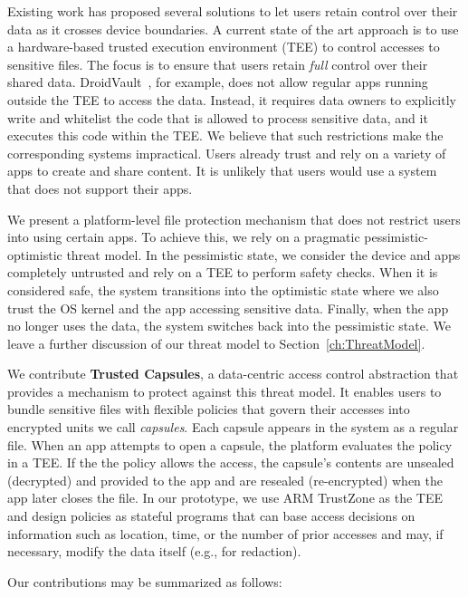  Existing work has proposed several solutions to let users retain control over their data as it crosses device boundaries. A current
  state of the art approach is to use a hardware-based trusted
  execution environment (TEE) to control accesses to sensitive files.
  The focus is to ensure that users retain {\em full} control over their shared data. DroidVault~\cite{li14droidvault}, for example, does not allow regular apps running outside the TEE to access the data. Instead, it requires data owners to explicitly write and whitelist the code that is allowed to process sensitive data, and it executes this code within the TEE. We believe that such restrictions make the corresponding systems impractical. Users already trust and rely on a variety of apps to create and share content. It is unlikely
  that users would use a system that does not support their apps.
  
  We present a platform-level file protection mechanism that does not restrict users into using certain apps. To achieve this, we rely on a pragmatic pessimistic-optimistic threat model. In the pessimistic state, we consider the device and apps completely untrusted and rely on a TEE to perform safety checks. When it is considered safe, the
  system transitions into the optimistic state where we also trust the
  OS kernel and the app accessing sensitive data. Finally, when the app no longer uses the data, the system switches back into the pessimistic state. We leave a further discussion of our threat model to Section~\ref{ch:ThreatModel}.
  
  We contribute {\bf Trusted Capsules}, a data-centric access control abstraction that provides a mechanism to protect against this threat model. It enables users to bundle sensitive files with
  flexible policies that govern their accesses into encrypted units we call {\em
    capsules}. Each capsule appears in the system as a regular file. When an app
  attempts to open a capsule, the platform evaluates the policy in a TEE. If the
  the policy allows the access, the capsule's contents are unsealed (decrypted) and
  provided to the app and are resealed (re-encrypted) when the app later closes
  the file. In our prototype, we use ARM TrustZone as the TEE and design policies
  as stateful programs that can base access decisions on information such as
  location, time, or the number of prior accesses and may, if necessary, modify
  the data itself (e.g., for redaction).

  Our contributions may be summarized as follows:

